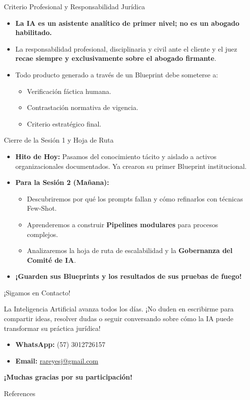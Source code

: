 \documentclass[aspectratio=169]{beamer}
\begin{document}
\begin{frame}{Criterio Profesional y Responsabilidad Jurídica}

\begin{itemize}
  \item \textbf{La IA es un asistente analítico de primer nivel; no es un abogado habilitado.}
  \item La responsabilidad profesional, disciplinaria y civil ante el cliente y el juez \textbf{recae siempre y exclusivamente sobre el abogado firmante}.
  \item Todo producto generado a través de un Blueprint debe someterse a:
  \begin{itemize}
    \item Verificación fáctica humana.
    \item Contrastación normativa de vigencia.
    \item Criterio estratégico final.
  \end{itemize}
\end{itemize}
\end{frame}

\begin{frame}{Cierre de la Sesión 1 y Hoja de Ruta}

\begin{itemize}
  \item \textbf{Hito de Hoy:} Pasamos del conocimiento tácito y aislado a activos organizacionales documentados. Ya crearon su primer Blueprint institucional.
  \item \textbf{Para la Sesión 2 (Mañana):}
  \begin{itemize}
    \item Descubriremos por qué los prompts fallan y cómo refinarlos con técnicas Few-Shot.
    \item Aprenderemos a construir \textbf{Pipelines modulares} para procesos complejos.
    \item Analizaremos la hoja de ruta de escalabilidad y la \textbf{Gobernanza del Comité de IA}.
  \end{itemize}
  \item \textbf{¡Guarden sus Blueprints y los resultados de sus pruebas de fuego!}
\end{itemize}
\end{frame}

\begin{frame}{¡Sigamos en Contacto!}


La Inteligencia Artificial avanza todos  los días. ¡No duden en escribirme para compartir ideas, resolver dudas o seguir conversando sobre cómo la IA puede transformar su práctica jurídica!

\begin{itemize}
  \item \textbf{WhatsApp:} (57) 3012726157
  \item \textbf{Email:} \href{mailto:rareyesj@gmail.com}{rareyesj@gmail.com}
\end{itemize}
\textbf{¡Muchas gracias por su participación!}

\end{frame}



\begin{frame}[allowframebreaks]{References}
  
  
\end{frame}
\end{document}
